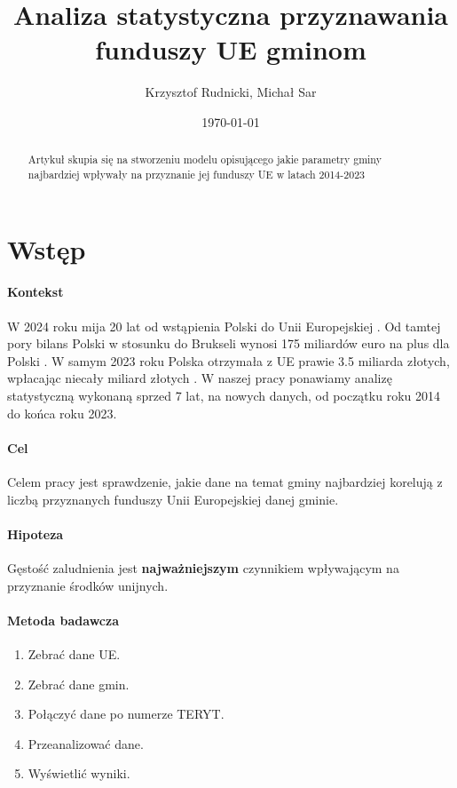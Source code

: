 \documentclass[12pt]{article}
\title{Analiza statystyczna przyznawania funduszy UE gminom}
\author{Krzysztof Rudnicki, Michał Sar}
\date{\today}
\begin{document}
\maketitle

\tableofcontents

\begin{abstract}
    Artykuł skupia się na stworzeniu modelu opisującego jakie parametry gminy najbardziej wpływały na przyznanie jej funduszy UE w latach 2014-2023
\end{abstract}

\section{Wstęp}
\paragraph{Kontekst}
W 2024 roku mija 20 lat od wstąpienia Polski do Unii Europejskiej \cite{1}. 
Od tamtej pory bilans Polski w stosunku do Brukseli wynosi 175 miliardów euro na plus dla Polski \cite{2}. W samym 2023 roku Polska otrzymała z UE prawie 3.5 miliarda złotych, wpłacając niecały miliard złotych \cite{3}. W naszej pracy ponawiamy analizę statystyczną wykonaną sprzed 7 lat, na nowych danych, od początku roku 2014 do końca roku 2023.
\paragraph{Cel}
Celem pracy jest sprawdzenie, jakie dane na temat gminy najbardziej korelują z liczbą przyznanych funduszy Unii Europejskiej danej gminie.
\paragraph{Hipoteza}
Gęstość zaludnienia jest \textbf{najważniejszym} czynnikiem wpływającym na przyznanie środków unijnych.
\paragraph{Metoda badawcza}
\begin{enumerate}
    \item Zebrać dane UE.
    \item Zebrać dane gmin.
    \item Połączyć dane po numerze TERYT.
    \item Przeanalizować dane.
    \item Wyświetlić wyniki.
\end{enumerate}
\end{document}
